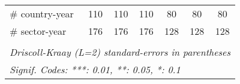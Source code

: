 \documentclass[a4paper]{article}
\begin{document}
\begin{table}[h!]
\begin{tabular}{lcccccc}
     \# country-year           & 110                   & 110                    & 110                    & 80                     & 80                     & 80\\  
      \# sector-year            & 176                   & 176                    & 176                    & 128                    & 128                    & 128\\  
      \bottomrule \\ [-0.9em]
      \multicolumn{7}{l}{\emph{Driscoll-Kraay (L=2) standard-errors in parentheses}}\\
      \multicolumn{7}{l}{\emph{Signif. Codes: ***: 0.01, **: 0.05, *: 0.1}}\\
   \end{tabular}
\end{table}
\FloatBarrier
\end{document}
